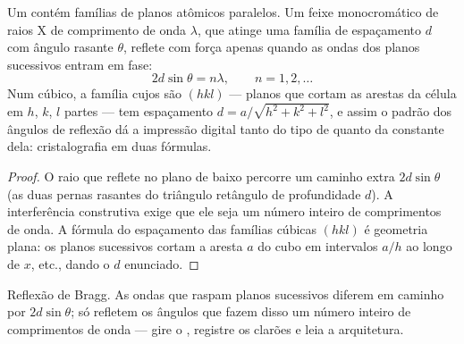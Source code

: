 \begin{proposition}\label{prop:b3:crystalline-solids:bragg}
Um  contém famílias de planos atômicos paralelos. Um
feixe monocromático de raios X de comprimento de onda $\lambda$, que
atinge uma família de espaçamento $d$ com ângulo rasante $\theta$,
reflete com força apenas quando as ondas dos planos sucessivos entram em fase:
\[
2d\sin\theta = n\lambda , \qquad n = 1, 2, \dots
\]
Num  cúbico, a família cujos \emph{} são
$(hkl)$ --- planos que cortam as arestas da célula em $h$, $k$, $l$ partes
--- tem espaçamento $d = a/\sqrt{h^2 + k^2 + l^2}$, e assim o padrão dos
ângulos de reflexão dá a impressão digital tanto do tipo de  quanto
da constante dela: cristalografia em duas fórmulas.
\end{proposition}

\begin{proof}
O raio que reflete no plano de baixo percorre um caminho extra $2d
\sin\theta$ (as duas pernas rasantes do triângulo retângulo de
profundidade $d$). A interferência construtiva exige que ele seja um
número inteiro de comprimentos de onda. A fórmula do espaçamento das
famílias cúbicas $(hkl)$ é geometria plana: os planos sucessivos cortam
a aresta $a$ do cubo em intervalos $a/h$ ao longo de $x$, etc., dando o
$d$ enunciado.
\end{proof}

\begin{omfigure}

{\small Reflexão de Bragg. As ondas que raspam planos sucessivos
diferem em caminho por $2d\sin\theta$; só refletem os ângulos que fazem
disso um número inteiro de comprimentos de onda --- gire o ,
registre os clarões e leia a arquitetura.}
\end{omfigure}

